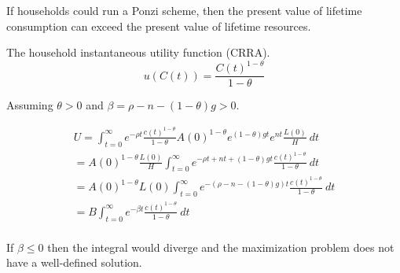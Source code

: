 \documentclass[]{article}
\begin{document}
	\begin{remark}
		If households could run a Ponzi scheme, then the present value of lifetime consumption can exceed the present value of lifetime resources.
	\end{remark}
	The household instantaneous utility function (CRRA).
	\begin{equation}
		u(C(t)) = \frac{C(t)^{1 - \theta}}{1 - \theta}
	\end{equation}
	\begin{assumption}
		Assuming $\theta > 0$ and $\beta = \rho - n - (1-\theta)g > 0$.
	\end{assumption}
	\begin{gather*}
		U = \int_{t=0}^\infty e^{-\rho t} \frac{c(t)^{1-\theta}}{1-\theta} A(0)^{1-\theta} e^{(1-\theta)gt} e^{nt} \frac{L(0)}{H}\ dt\\
		= A(0)^{1 - \theta} \frac{L(0)}{H} \int_{t=0}^\infty {e^{-\rho t + nt + (1-\theta)gt} \frac{c(t)^{1-\theta}}{1-\theta}\ dt} \\
		= A(0)^{1 - \theta} L(0) \int_{t=0}^\infty {e^{-(\rho - n - (1-\theta)g)t} \frac{c(t)^{1-\theta}}{1-\theta}\ dt} \\
		= B \int_{t=0}^\infty e^{-\beta t}\frac{c(t)^{1-\theta}}{1- \theta}\ dt \\
	\end{gather*}
	\begin{remark}
		If $\beta \leq 0$ then the integral would diverge and the maximization problem does not have a well-defined solution.
	\end{remark}
\end{document}
